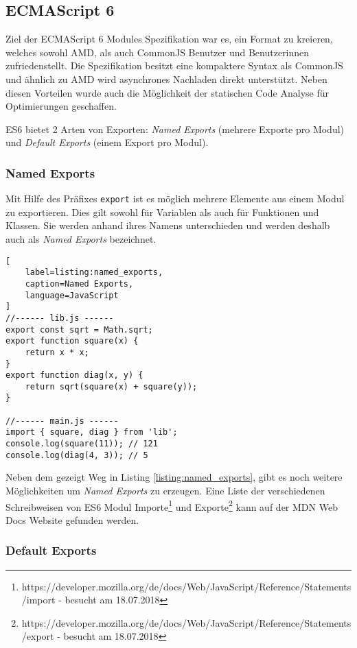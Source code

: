 \subsection{ECMAScript 6}
Ziel der ECMAScript 6 Modules Spezifikation war es, ein Format zu kreieren, welches sowohl AMD, als auch CommonJS Benutzer und Benutzerinnen zufriedenstellt. Die Spezifikation besitzt eine kompaktere Syntax als CommonJS und ähnlich zu AMD wird asynchrones Nachladen direkt unterstützt. Neben diesen Vorteilen wurde auch die Möglichkeit der statischen Code Analyse für Optimierungen geschaffen. 

ES6 bietet 2 Arten von Exporten: \textit{Named Exports} (mehrere Exporte pro Modul) und \textit{Default Exports} (einem Export pro Modul). \autocite{Rauschmayer2014}

\subsubsection{Named Exports}
\label{subsubsection:named_exports}

Mit Hilfe des Präfixes \lstinline{export} ist es möglich mehrere Elemente aus einem Modul zu exportieren. Dies gilt sowohl für Variablen als auch für Funktionen und Klassen. Sie werden anhand ihres Namens unterschieden und werden deshalb auch als \textit{Named Exports} bezeichnet. \autocite{Rauschmayer2014}

\begin{lstlisting}[
    label=listing:named_exports,
	caption=Named Exports,
	language=JavaScript
]
//------ lib.js ------
export const sqrt = Math.sqrt;
export function square(x) {
    return x * x;
}
export function diag(x, y) {
    return sqrt(square(x) + square(y));
}

//------ main.js ------
import { square, diag } from 'lib';
console.log(square(11)); // 121
console.log(diag(4, 3)); // 5
\end{lstlisting}

Neben dem gezeigt Weg in Listing \ref{listing:named_exports}, gibt es noch weitere Möglichkeiten um \textit{Named Exports} zu erzeugen. Eine Liste der verschiedenen Schreibweisen von ES6 Modul Importe\footnote{https://developer.mozilla.org/de/docs/Web/JavaScript/Reference/Statements/import - besucht am 18.07.2018} und Exporte\footnote{https://developer.mozilla.org/de/docs/Web/JavaScript/Reference/Statements/export - besucht am 18.07.2018} kann auf der MDN Web Docs Website gefunden werden.

\subsubsection{Default Exports}
\label{subsubsection:default_exports}

